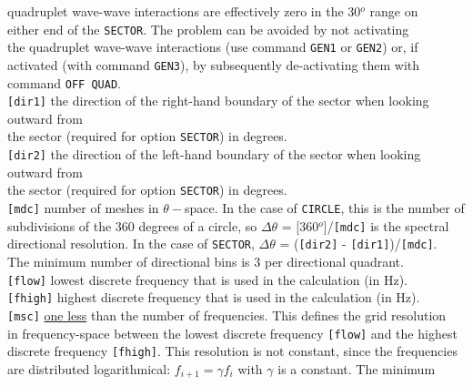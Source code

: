 \documentclass[12pt]{book}
\begin{document}
\begin{tabbing}
                     quadruplet wave-wave interactions are effectively zero in the 30$^o$ range on\\
                     either end of the {\tt SECTOR}. The problem can be avoided by not activating\\
                     the quadruplet wave-wave interactions (use command {\tt GEN1} or {\tt GEN2}) or, if\\
                     activated (with command {\tt GEN3}), by subsequently de-activating them with\\
                     command {\tt OFF QUAD}.\-\\
{\tt [dir1]}      \> the direction of the right-hand boundary of the sector when looking outward from\+\\
                     the sector (required for option {\tt SECTOR}) in degrees.\-\\
{\tt [dir2]}      \> the direction of the left-hand boundary of the sector when looking outward from\+\\
                     the sector (required for option {\tt SECTOR}) in degrees.\-\\
{\tt [mdc]}       \> number of meshes in $\theta-$space. In the case of {\tt CIRCLE}, this is the number of\+\\
                     subdivisions of the 360 degrees of a circle, so $\Delta\theta$ = [360$^o$]/{\tt [mdc]} is the spectral\\
                     directional resolution. In the case of {\tt SECTOR}, $\Delta\theta$ = ({\tt [dir2]} - {\tt [dir1]})/{\tt [mdc]}.\\
                     The minimum number of directional bins is 3 per directional quadrant.\-\\
{\tt [flow]}      \> lowest discrete frequency that is used in the calculation (in Hz).\\
{\tt [fhigh]}     \> highest discrete frequency that is used in the calculation (in Hz).\\
{\tt [msc]}       \> \underline{one less} than the number of frequencies. This defines the grid resolution\+\\
                     in frequency-space between the lowest discrete frequency {\tt [flow]} and the highest\\
                     discrete frequency {\tt [fhigh]}. This resolution is not constant, since the frequencies\\
                     are distributed logarithmical: $f_{i+1} = \gamma f_i$ with $\gamma$ is a constant. The minimum\\

\end{tabbing}
\end{document}
